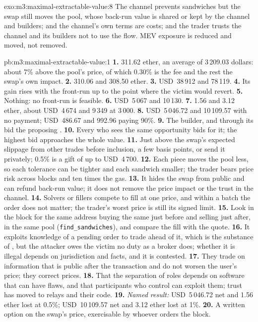 \begin{solution}{exo:m3:maximal-extractable-value:8}
The channel prevents sandwiches but the swap still moves the pool, whose back-run value is shared or kept by the channel and
builders;  and the channel's own terms are costs; and the trader trusts the channel and its builders not to use
the flow. MEV exposure is reduced and moved, not removed.
\end{solution}

\begin{solution}{pb:m3:maximal-extractable-value:1}
\textbf{1.} 311.62 ether, an average of 3\,209.03 dollars: about 7\% above the pool's price, of which 0.30\% is the fee and
the rest the swap's own impact. \textbf{2.} 310.06 and 308.50 ether. \textbf{3.} USD~38\,912 and 78\,119. \textbf{4.} Its
gain rises with the front-run up to the point where the victim would revert. \textbf{5.} Nothing: no front-run is feasible.
\textbf{6.} USD~5\,067 and 10\,130. \textbf{7.} 1.56 and 3.12 ether, about USD~4\,674 and 9\,349 at 3\,000. \textbf{8.}
USD~5\,046.72 and 10\,109.57 with no payment; USD~486.67 and 992.96 paying 90\%. \textbf{9.} The builder, and through its
bid the proposing . \textbf{10.} Every  who sees the same opportunity bids for it; the highest bid approaches
the whole value. \textbf{11.} Just above the swap's expected slippage from other trades before inclusion, a few basis points, or
send it privately; 0.5\% is a gift of up to USD~4\,700. \textbf{12.} Each piece moves the pool less, so each tolerance can be
tighter and each sandwich smaller; the trader bears price risk across blocks and ten times the gas. \textbf{13.} It hides the
swap from public  and can refund back-run value; it does not remove the price impact or the trust in the channel.
\textbf{14.} Solvers or fillers compete to fill at one price, and within a batch the order does not matter; the trader's worst
price is still its signed limit. \textbf{15.} Look in the block for the same address buying the same  just before and
selling just after, in the same pool (\texttt{find\_sandwiches}), and compare the fill with the quote. \textbf{16.} It exploits
knowledge of a pending order to trade ahead of it, which is the substance of , but the attacker owes the victim no
duty as a broker does; whether it is illegal depends on jurisdiction and facts, and it is contested. \textbf{17.} They trade on
information that is public after the transaction and do not worsen the user's price; they correct prices. \textbf{18.} That the
separation of roles depends on software that can have flaws, and that participants who control  can exploit them;
trust has moved to relays and their code. \textbf{19.} \emph{Named result:} USD~5\,046.72 net and 1.56 ether lost at 0.5\%;
USD~10\,109.57 net and 3.12 ether lost at 1\%. \textbf{20.} A written option on the swap's price, exercisable by whoever orders
the block.
\end{solution}

